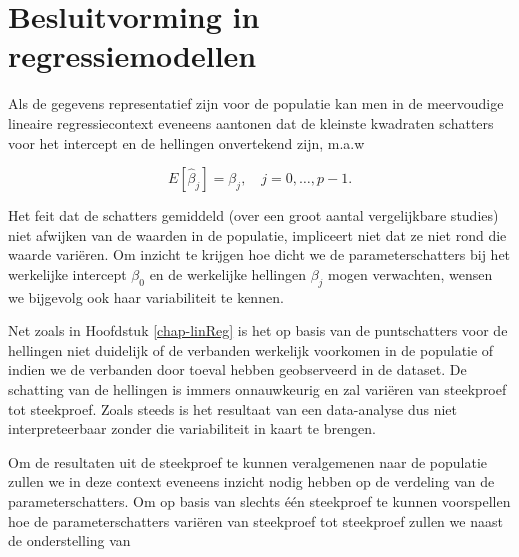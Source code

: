 \documentclass[
  12pt,dutch,coursenotes]{book}
\theoremstyle{definition}
\theoremstyle{definition}
\theoremstyle{definition}
\theoremstyle{definition}
\theoremstyle{remark}
\begin{document}
\hypertarget{besluitvorming-in-regressiemodellen}{%
\section{Besluitvorming in regressiemodellen}\label{besluitvorming-in-regressiemodellen}}

Als de gegevens representatief zijn voor de populatie kan men in de meervoudige lineaire regressiecontext eveneens aantonen dat de kleinste kwadraten schatters voor het intercept en de hellingen onvertekend zijn, m.a.w

\[E[\hat \beta_j]=\beta_j,\quad j=0,\ldots,p-1.\]

Het feit dat de schatters gemiddeld (over een groot aantal vergelijkbare studies) niet afwijken van de waarden in de populatie, impliceert niet dat ze niet rond die waarde variëren.
Om inzicht te krijgen hoe dicht we de parameterschatters bij het werkelijke intercept \(\beta_0\) en de werkelijke hellingen \(\beta_j\) mogen verwachten, wensen we bijgevolg ook haar variabiliteit te kennen.

Net zoals in Hoofdstuk \ref{chap-linReg} is het op basis van de puntschatters voor de hellingen niet duidelijk of de verbanden werkelijk voorkomen in de populatie of indien we de verbanden door toeval hebben geobserveerd in de dataset.
De schatting van de hellingen is immers onnauwkeurig en zal variëren van steekproef tot steekproef.
Zoals steeds is het resultaat van een data-analyse dus niet interpreteerbaar zonder die variabiliteit in kaart te brengen.

Om de resultaten uit de steekproef te kunnen veralgemenen naar de populatie zullen we in deze context eveneens inzicht nodig hebben op de verdeling van de parameterschatters.
Om op basis van slechts één steekproef te kunnen voorspellen hoe de parameterschatters variëren van steekproef tot steekproef zullen we naast de onderstelling van
\end{document}
